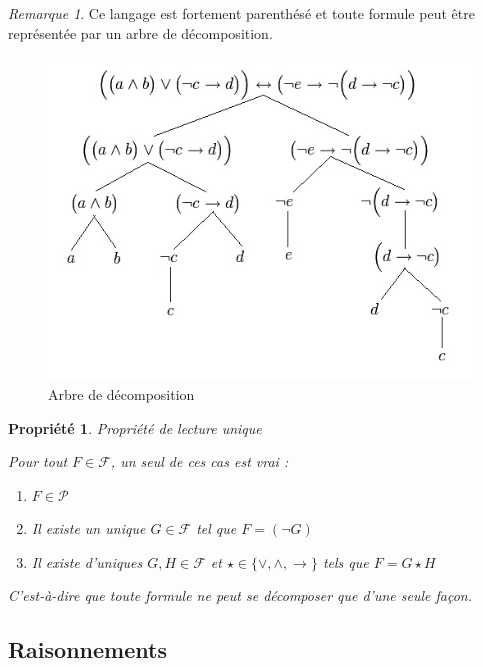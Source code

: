 \documentclass[]{article}
\newtheorem{myproperty}{Propriété}
\theoremstyle{remark}
\newtheorem{myrem}{Remarque}
\theoremstyle{definition}
\begin{document}
\begin{myrem}
	Ce langage est fortement parenthésé et toute formule peut être représentée par un arbre de décomposition.
\end{myrem}

\begin{figure}[h!]
	\centering
	\includegraphics{Arbre_decomposition}
	\caption{Arbre de décomposition}
\end{figure}

\begin{myproperty}{Propriété de lecture unique}

	Pour tout $F \in \mathcal{F}$, un seul de ces cas est vrai :
	
	\begin{enumerate}
		\item $F \in \mathcal{P}$
		\item Il existe un \textit{unique} $G \in \mathcal{F}$ tel que $F = (\neg G)$

		\item Il existe d'\textit{uniques} $G,H \in \mathcal{F}$ et $\star \in \{\lor, \land, \rightarrow \}$ tels que $F = G \star H$
	\end{enumerate}

	C'est-à-dire que toute formule ne peut se décomposer que d'une seule façon.
\end{myproperty}

\subsection{Raisonnements}
\end{document}

